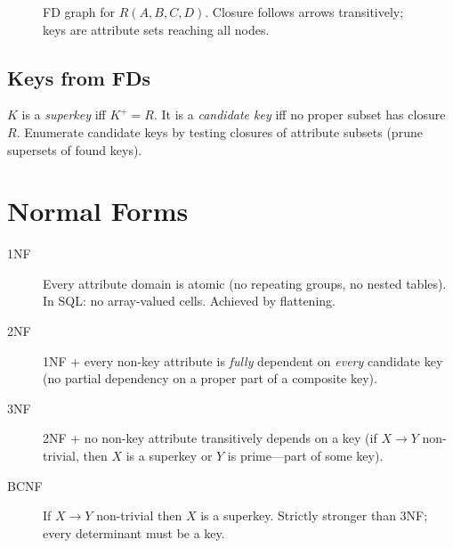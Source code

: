 \begin{figure}[h]
\centering
{}
\caption{FD graph for $R(A,B,C,D)$. Closure follows arrows transitively; keys are attribute sets reaching all nodes.}
\label{fig:fd-graph}
\end{figure}

\subsection{Keys from FDs}

$K$ is a \emph{superkey} iff $K^+=R$. It is a \emph{candidate key} iff no proper subset has closure $R$. Enumerate candidate keys by testing closures of attribute subsets (prune supersets of found keys).

\section{Normal Forms}
\label{sec:nfs}

\begin{description}
    \item[1NF] Every attribute domain is atomic (no repeating groups, no nested tables). In SQL: no array-valued cells. Achieved by flattening.
    \item[2NF] 1NF + every non-key attribute is \emph{fully} dependent on \emph{every} candidate key (no partial dependency on a proper part of a composite key).
    \item[3NF] 2NF + no non-key attribute transitively depends on a key (if $X\to Y$ non-trivial, then $X$ is a superkey or $Y$ is prime---part of some key).
    \item[BCNF] If $X\to Y$ non-trivial then $X$ is a superkey. Strictly stronger than 3NF; every determinant must be a key.
\end{description}

